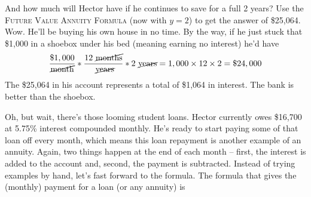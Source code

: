 And how much will Hector have if he continues to save for a full 2 years?  Use the   \textsc{Future Value Annuity Formula} (now with $y=2$) to get the answer of \$25,064.
Wow.  He'll be buying his own house in no time.  By the way, if he just stuck that \$1,000 in a shoebox under his bed (meaning earning no interest) he'd have 
$$\frac{\$1,000}{\cancel{\text{month}}} \ast \frac{12 \text{ \cancel{months}}}{\text{ \cancel{years}}} \ast 2 \text{ \cancel{years}}= 1,000 \times 12 \times 2 = \$24,000$$
The \$25,064 in his account represents a total of \$1,064 in interest.  The bank is better than the shoebox.

Oh, but wait, there's those looming student loans.  Hector currently owes \$16,700 at 5.75\% interest compounded monthly.  He's ready to start paying some of that loan off every month, which means this loan repayment is another example of an annuity.  Again, two things happen at the end of each month -- first, the interest is added to the account and, second, the payment is subtracted.  Instead of trying examples by hand, let's fast forward to the formula.  The formula that gives the (monthly) payment for a loan (or any annuity) is

 \bigskip
\bigskip

